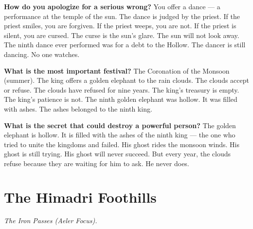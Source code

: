 \begin{almanac}
\textbf{How do you apologize for a serious wrong?} You offer a dance --- a performance at the temple of the sun. The dance is judged by the priest. If the priest smiles, you are forgiven. If the priest weeps, you are not. If the priest is silent, you are cursed. The curse is the sun's glare. The sun will not look away. The ninth dance ever performed was for a debt to the Hollow. The dancer is still dancing. No one watches.

\textbf{What is the most important festival?} The Coronation of the Monsoon (summer). The king offers a golden elephant to the rain clouds. The clouds accept or refuse. The clouds have refused for nine years. The king's treasury is empty. The king's patience is not. The ninth golden elephant was hollow. It was filled with ashes. The ashes belonged to the ninth king.

\textbf{What is the secret that could destroy a powerful person?} The golden elephant is hollow. It is filled with the ashes of the ninth king --- the one who tried to unite the kingdoms and failed. His ghost rides the monsoon winds. His ghost is still trying. His ghost will never succeed. But every year, the clouds refuse because they are waiting for him to ask. He never does.
\end{almanac}

\newpage

\newpage

\chapter{The Himadri Foothills}
\emph{The Iron Passes (Aeler Focus).}

